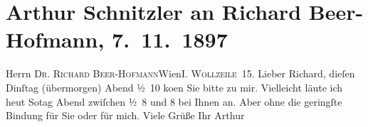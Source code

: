 

         
         \renewcommand{\erwaehntePersonen}{Personen: Richard Beer-Hofmann}
         \renewcommand{\erwaehnteOrte}{Orte: IX., Alsergrund, Wien, Wollzeile}
         \renewcommand{\erwaehnteWerke}{}
               \section[Arthur Schnitzler an Richard Beer-Hofmann, 7. 11. 1897]{ Arthur Schnitzler an Richard Beer-Hofmann, 7. 11. 1897}\nopagebreak{}\rehead{ }\begin{ledgroupsized}[t]{13cm}\normalsize\beginnumbering \toendnotes[C]{\smallbreak\pagebreak[2]} 
\pstart{}{\pb}Herrn \textsc{Dr. Richard
                     Beer-Hofmann}\pend{}\pstart{}Wien\pend{}\pstart{}\textsc{I. Wollzeile 15}.\pend{}{\bigskip}\pstart
           \noindent{}{\pb}Lieber Richard, dieſen
                  Dinſtag (übermorgen) Abend ½ 10 ko{\geminationm}en Sie bitte zu mir.\pend
           \pstart
           Vielleicht läute ich heut So{\geminationn}tag{ }Abend zwiſchen ½ 8 und 8 bei Ihnen an. Aber
               ohne die geringſte Bindung für Sie oder für mich.\pend
           \pstart Viele Grüße Ihr \spacefill\mbox{Arthur}\pend{}
         
         \endnumbering{}\end{ledgroupsized}  \newcommand{\dateiname}{L00736}\newcommand{\titel}{Arthur Schnitzler an Richard Beer-Hofmann, 7. 11. 1897}\newcommand{\editorInnen}{Martin Anton Müller und Gerd-Hermann Susen}
      